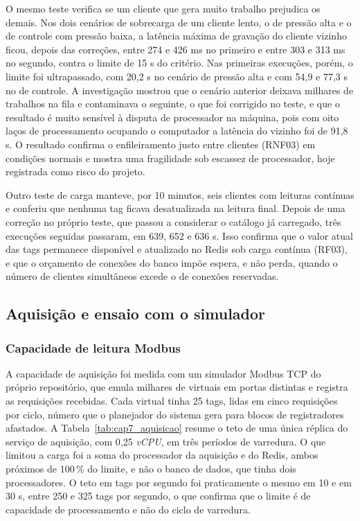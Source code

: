 \par O mesmo teste verifica se um cliente que gera muito trabalho prejudica os demais. Nos dois cenários de sobrecarga de um cliente lento, o de pressão alta e o de controle com pressão baixa, a latência máxima de gravação do cliente vizinho ficou, depois das correções, entre 274 e 426 ms no primeiro e entre 303 e 313 ms no segundo, contra o limite de 15 s do critério. Nas primeiras execuções, porém, o limite foi ultrapassado, com 20,2 s no cenário de pressão alta e com 54,9 e 77,3 s no de controle. A investigação mostrou que o cenário anterior deixava milhares de trabalhos na fila e contaminava o seguinte, o que foi corrigido no teste, e que o resultado é muito sensível à disputa de processador na máquina, pois com oito laços de processamento ocupando o computador a latência do vizinho foi de 91,8 s. O resultado confirma o enfileiramento justo entre clientes (RNF03) em condições normais e mostra uma fragilidade sob escassez de processador, hoje registrada como risco do projeto.

\par Outro teste de carga manteve, por 10 minutos, seis clientes com leituras contínuas e conferiu que nenhuma tag ficava desatualizada na leitura final. Depois de uma correção no próprio teste, que passou a considerar o catálogo já carregado, três execuções seguidas passaram, em 639, 652 e 636 s. Isso confirma que o valor atual das tags permanece disponível e atualizado no Redis sob carga contínua (RF03), e que o orçamento de conexões do banco impõe espera, e não perda, quando o número de clientes simultâneos excede o de conexões reservadas.

\subsection{Aquisição e ensaio com o simulador}

\subsubsection{Capacidade de leitura Modbus}

\par A capacidade de aquisição foi medida com um simulador Modbus TCP do próprio repositório, que emula milhares de  virtuais em portas distintas e registra as requisições recebidas. Cada  virtual tinha 25 tags, lidas em cinco requisições por ciclo, número que o planejador do sistema gera para blocos de registradores afastados. A Tabela~\ref{tab:cap7_aquisicao} resume o teto de uma única réplica do serviço de aquisição, com 0,25 \emph{vCPU}, em três períodos de varredura. O que limitou a carga foi a soma do processador da aquisição e do Redis, ambos próximos de 100\,\% do limite, e não o banco de dados, que tinha dois processadores. O teto em tags por segundo foi praticamente o mesmo em 10 e em 30 s, entre 250 e 325 tags por segundo, o que confirma que o limite é de capacidade de processamento e não do ciclo de varredura.

